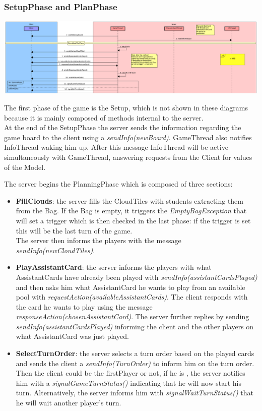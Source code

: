 \documentclass[12pt]{article}
\begin{document}
			\subsubsection{SetupPhase and PlanPhase}
				
				\begin{center}
					\includegraphics[width=\textwidth,height=\textheight,keepaspectratio]{Game_1}
				\end{center}
				
				The first phase of the game is the Setup, which is not shown in these diagrams because it is mainly composed of methods internal to the server. \\
				At the end of the SetupPhase the server sends the information regarding the game board to the client using a \emph{sendInfo(newBoard)}. GameThread also notifies InfoThread waking him up. After this message InfoThread will be active simultaneously with GameThread, answering requests from the Client for values of the Model.
				
				The server begins the PlanningPhase which is composed of three sections:
				\begin{itemize}
					\item \textbf{FillClouds}: the server fills the CloudTiles with students extracting them from the Bag. If the Bag is empty, it triggers the \emph{EmptyBagException} that will set a trigger which is then checked in the last phase: if the trigger is set this will be the last turn of the game. \\
					The server then informs the players with the message \emph{sendInfo(newCloudTiles)}.
					\item \textbf{PlayAssistantCard}: the server informs the players with what AssistantCards have already been played with \emph{sendInfo(assistantCardsPlayed)} and then asks him what AssistantCard he wants to play from an available pool with \emph{requestAction(availableAssistantCards)}. The client responds with the card he wants to play using the message \emph{responseAction(chosenAssistantCard)}. The server further replies by sending \emph{sendInfo(assistantCardsPlayed)} informing the client and the other players on what AssistantCard was just played. 
					\item \textbf{SelectTurnOrder}: the server selects a turn order based on the played cards and sends the client a \emph{sendInfo(TurnOrder)} to inform him on the turn order. Then the client could be the firstPlayer or not, if he is , the server notifies him with a \emph{signalGameTurnStatus()} indicating that he will now start his turn. Alternatively, the server informs him with \emph{signalWaitTurnStatus()} that he will wait another player's turn. 
				\end{itemize}
				
\end{document}

